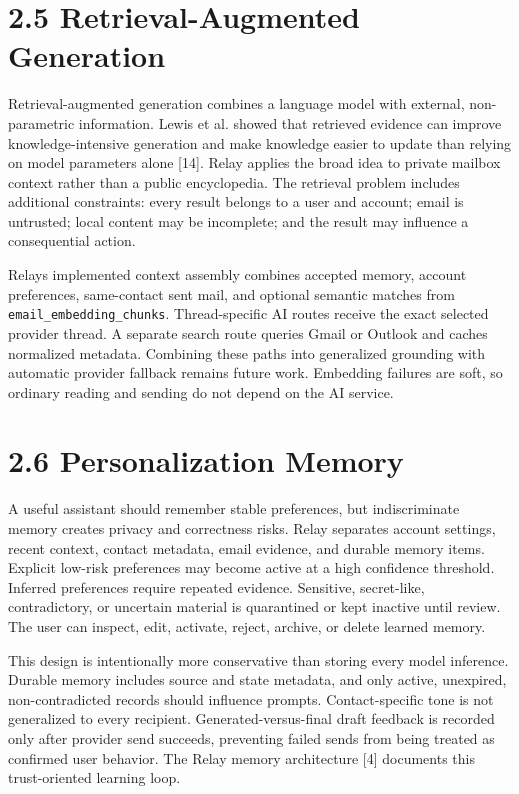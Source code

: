 \documentclass[
]{report}
\begin{document}
\section{2.5 Retrieval-Augmented
Generation}\label{25-retrieval-augmented-generation}

Retrieval-augmented generation combines a language model with external,
non-parametric information. Lewis et al. showed that retrieved evidence
can improve knowledge-intensive generation and make knowledge easier to
update than relying on model parameters alone {[}14{]}. Relay applies
the broad idea to private mailbox context rather than a public
encyclopedia. The retrieval problem includes additional constraints:
every result belongs to a user and account; email is untrusted; local
content may be incomplete; and the result may influence a consequential
action.

Relay\textquotesingle s implemented context assembly combines accepted
memory, account preferences, same-contact sent mail, and optional
semantic matches from \texttt{email\_embedding\_chunks}. Thread-specific
AI routes receive the exact selected provider thread. A separate search
route queries Gmail or Outlook and caches normalized metadata. Combining
these paths into generalized grounding with automatic provider fallback
remains future work. Embedding failures are soft, so ordinary reading and
sending do not depend on the AI service.

\section{2.6 Personalization Memory}\label{26-personalization-memory}

A useful assistant should remember stable preferences, but
indiscriminate memory creates privacy and correctness risks. Relay
separates account settings, recent context, contact metadata, email
evidence, and durable memory items. Explicit low-risk preferences may
become active at a high confidence threshold. Inferred preferences
require repeated evidence. Sensitive, secret-like, contradictory, or
uncertain material is quarantined or kept inactive until review. The
user can inspect, edit, activate, reject, archive, or delete learned
memory.

This design is intentionally more conservative than storing every model
inference. Durable memory includes source and state metadata, and only
active, unexpired, non-contradicted records should influence prompts.
Contact-specific tone is not generalized to every recipient.
Generated-versus-final draft feedback is recorded only after provider
send succeeds, preventing failed sends from being treated as confirmed
user behavior. The Relay memory architecture {[}4{]} documents this
trust-oriented learning loop.
\end{document}

